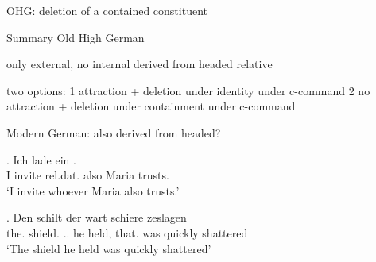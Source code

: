 \documentclass[12pt]{beamer}
\newcommand*{\mybox}[1]{\framebox{#1}} %
\begin{document}
\begin{frame}{OHG: deletion of a contained constituent}
{\phantom{x}

}

\end{frame}

\begin{frame}{Summary Old High German}

  only external, no internal
  derived from headed relative


  two options:
  1 attraction + deletion under identity under c-command
  2 no attraction + deletion under containment under c-command

\end{frame}




\begin{frame}{Modern German: also derived from headed?}

\exg. Ich {lade ein} \mybox{\tbf{wem}}   . \\
 I invite\scsub{[acc]} \ac{rel}.\ac{dat}. also Maria trusts\scsub{[dat]}.\\
 `I invite whoever Maria also trusts.' \label{ex:mg-acc-dat}

\pause

\exg. Den schilt \mybox{\tbf{den}}  { } der wart schiere zeslagen\\
the. shield. .. he held, that. was quickly shattered\\
`The shield he held was quickly shattered' \label{ex:iaheaded}

\pause


\end{frame}
\end{document}
